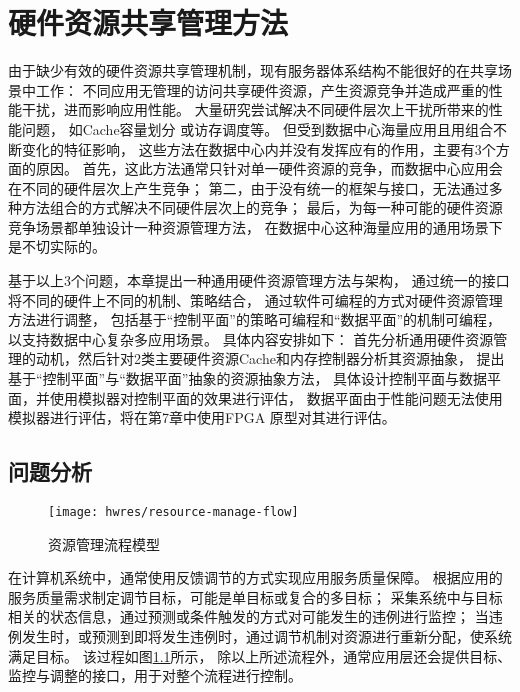 

\chapter{硬件资源共享管理方法}
\label{chap:hwresman}

由于缺少有效的硬件资源共享管理机制，现有服务器体系结构不能很好的在共享场景中工作：
不同应用无管理的访问共享硬件资源，产生资源竞争并造成严重的性能干扰，进而影响应用性能。
大量研究尝试解决不同硬件层次上干扰所带来的性能问题，
如Cache容量划分\cite{kasture_ubik:_2014, sanchez_vantage:_2011, sanchez_zcache:_2010, qureshi_utility-based_2006}
或访存调度\cite{muralidhara_reducing_2011}等。
但受到数据中心海量应用\cite{Reiss_googletrace_2012}且用组合不断变化的特征影响，
这些方法在数据中心内并没有发挥应有的作用，主要有3个方面的原因。
首先，这此方法通常只针对单一硬件资源的竞争，而数据中心应用会在不同的硬件层次上产生竞争；
第二，由于没有统一的框架与接口，无法通过多种方法组合的方式解决不同硬件层次上的竞争；
最后，为每一种可能的硬件资源竞争场景都单独设计一种资源管理方法，
在数据中心这种海量应用的通用场景下是不切实际的。

基于以上3个问题，本章提出一种通用硬件资源管理方法与架构，
通过统一的接口将不同的硬件上不同的机制、策略结合，
通过软件可编程的方式对硬件资源管理方法进行调整，
包括基于``控制平面''的策略可编程和``数据平面''的机制可编程，以支持数据中心复杂多应用场景。
具体内容安排如下：
首先分析通用硬件资源管理的动机，然后针对2类主要硬件资源Cache和内存控制器分析其资源抽象，
提出基于``控制平面''与``数据平面''抽象的资源抽象方法，
具体设计控制平面与数据平面，并使用模拟器对控制平面的效果进行评估，
数据平面由于性能问题无法使用模拟器进行评估，将在第7章中使用FPGA 原型对其进行评估。


\section{问题分析}

\begin{figure}[tb]
  \centering
  \texttt{[image: hwres/resource-manage-flow]}
  \caption{资源管理流程模型}
  \label{fig:resource-manage-flow}
\end{figure}

在计算机系统中，通常使用反馈调节的方式实现应用服务质量保障。
根据应用的服务质量需求制定调节目标，可能是单目标或复合的多目标；
采集系统中与目标相关的状态信息，通过预测或条件触发的方式对可能发生的违例进行监控；
当违例发生时，或预测到即将发生违例时，通过调节机制对资源进行重新分配，使系统满足目标。
该过程如图\ref{fig:resource-manage-flow}所示，
除以上所述流程外，通常应用层还会提供目标、监控与调整的接口，用于对整个流程进行控制。

